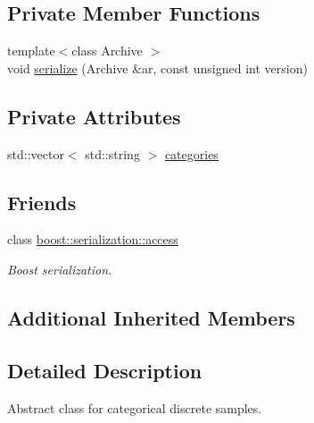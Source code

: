\subsection*{Private Member Functions}
\begin{DoxyCompactItemize}
\item 
{\footnotesize template$<$class Archive $>$ }\\void \hyperlink{class_c_categorical_sample_a7f4ae293dfb2f77bd6d9b525f1e9cbf1}{serialize} (Archive \&ar, const unsigned int version)
\end{DoxyCompactItemize}
\subsection*{Private Attributes}
\begin{DoxyCompactItemize}
\item 
std\-::vector$<$ std\-::string $>$ \hyperlink{class_c_categorical_sample_ae713b59c14aba1434e1754d837a4eeb0}{categories}
\end{DoxyCompactItemize}
\subsection*{Friends}
\begin{DoxyCompactItemize}
\item 
class \hyperlink{class_c_categorical_sample_ac98d07dd8f7b70e16ccb9a01abf56b9c}{boost\-::serialization\-::access}
\begin{DoxyCompactList}\small\item\em Boost serialization. \end{DoxyCompactList}\end{DoxyCompactItemize}
\subsection*{Additional Inherited Members}


\subsection{Detailed Description}
Abstract class for categorical discrete samples. 


